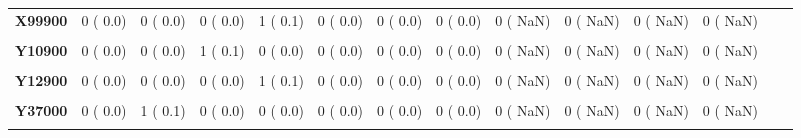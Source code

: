 \documentclass[
]{article}
\begin{document}
\begin{table}[H]
\begin{tabular}[t]{>{\raggedright\arraybackslash}p{5em}ccccccccccccc}
\textbf{X99900} & 0 (  0.0) & 0 (  0.0) & 0 (  0.0) & 1 (  0.1) & 0 (  0.0) & 0 (  0.0) & 0 (  0.0) & 0 (  NaN) & 0 (  NaN) & 0 (  NaN) & 0 (  NaN) &  & \\
\textbf{\cellcolor{gray!10}{Y09900}} & \cellcolor{gray!10}{0 (  0.0)} & \cellcolor{gray!10}{0 (  0.0)} & \cellcolor{gray!10}{1 (  0.1)} & \cellcolor{gray!10}{0 (  0.0)} & \cellcolor{gray!10}{0 (  0.0)} & \cellcolor{gray!10}{0 (  0.0)} & \cellcolor{gray!10}{0 (  0.0)} & \cellcolor{gray!10}{0 (  NaN)} & \cellcolor{gray!10}{0 (  NaN)} & \cellcolor{gray!10}{0 (  NaN)} & \cellcolor{gray!10}{0 (  NaN)} & \cellcolor{gray!10}{} & \cellcolor{gray!10}{}\\
\textbf{Y10900} & 0 (  0.0) & 0 (  0.0) & 1 (  0.1) & 0 (  0.0) & 0 (  0.0) & 0 (  0.0) & 0 (  0.0) & 0 (  NaN) & 0 (  NaN) & 0 (  NaN) & 0 (  NaN) &  & \\
\textbf{\cellcolor{gray!10}{Y11000}} & \cellcolor{gray!10}{0 (  0.0)} & \cellcolor{gray!10}{1 (  0.1)} & \cellcolor{gray!10}{0 (  0.0)} & \cellcolor{gray!10}{0 (  0.0)} & \cellcolor{gray!10}{0 (  0.0)} & \cellcolor{gray!10}{0 (  0.0)} & \cellcolor{gray!10}{0 (  0.0)} & \cellcolor{gray!10}{0 (  NaN)} & \cellcolor{gray!10}{0 (  NaN)} & \cellcolor{gray!10}{0 (  NaN)} & \cellcolor{gray!10}{0 (  NaN)} & \cellcolor{gray!10}{} & \cellcolor{gray!10}{}\\
\textbf{Y12900} & 0 (  0.0) & 0 (  0.0) & 0 (  0.0) & 1 (  0.1) & 0 (  0.0) & 0 (  0.0) & 0 (  0.0) & 0 (  NaN) & 0 (  NaN) & 0 (  NaN) & 0 (  NaN) &  & \\
\textbf{\cellcolor{gray!10}{Y14900}} & \cellcolor{gray!10}{0 (  0.0)} & \cellcolor{gray!10}{1 (  0.1)} & \cellcolor{gray!10}{0 (  0.0)} & \cellcolor{gray!10}{0 (  0.0)} & \cellcolor{gray!10}{0 (  0.0)} & \cellcolor{gray!10}{0 (  0.0)} & \cellcolor{gray!10}{1 (  0.4)} & \cellcolor{gray!10}{0 (  NaN)} & \cellcolor{gray!10}{0 (  NaN)} & \cellcolor{gray!10}{0 (  NaN)} & \cellcolor{gray!10}{0 (  NaN)} & \cellcolor{gray!10}{} & \cellcolor{gray!10}{}\\
\textbf{Y37000} & 0 (  0.0) & 1 (  0.1) & 0 (  0.0) & 0 (  0.0) & 0 (  0.0) & 0 (  0.0) & 0 (  0.0) & 0 (  NaN) & 0 (  NaN) & 0 (  NaN) & 0 (  NaN) &  & \\
\textbf{\cellcolor{gray!10}{Y65800}} & \cellcolor{gray!10}{1 (  0.1)} & \cellcolor{gray!10}{0 (  0.0)} & \cellcolor{gray!10}{0 (  0.0)} & \cellcolor{gray!10}{0 (  0.0)} & \cellcolor{gray!10}{0 (  0.0)} & \cellcolor{gray!10}{0 (  0.0)} & \cellcolor{gray!10}{0 (  0.0)} & \cellcolor{gray!10}{0 (  NaN)} & \cellcolor{gray!10}{0 (  NaN)} & \cellcolor{gray!10}{0 (  NaN)} & \cellcolor{gray!10}{0 (  NaN)} & \cellcolor{gray!10}{} & \cellcolor{gray!10}{}\\

\end{tabular}
\end{table}
\end{document}
